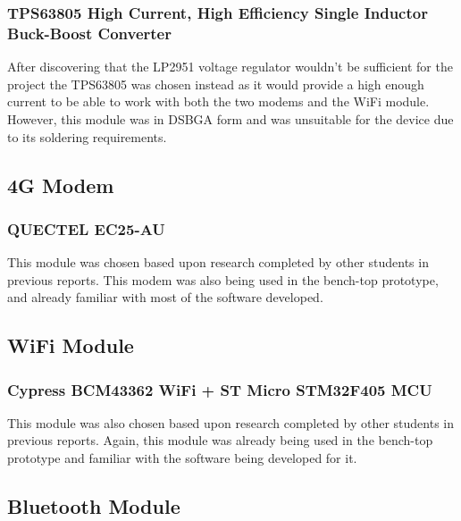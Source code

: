 \subsubsection{TPS63805 High Current, High Efficiency Single Inductor Buck-Boost Converter}

After discovering that the LP2951 voltage regulator wouldn't be sufficient for the project the TPS63805 was chosen instead as it would provide a high enough current to be able to work with both the two modems and the WiFi module. 
However, this module was in DSBGA form and was unsuitable for the device due to its soldering requirements. 



\subsection{4G Modem}
\subsubsection{ QUECTEL EC25-AU}

	This module was chosen based upon research completed by other students in previous reports. 
This modem was also being used in the bench-top prototype, and already familiar with most of the software developed. 

\subsection{WiFi Module}
\subsubsection{Cypress BCM43362 WiFi + ST Micro STM32F405 MCU}
		This module was also chosen based upon research completed by other students in previous reports. 
Again, this module was already being used in the bench-top prototype and familiar with the software being developed for it. 


\subsection{Bluetooth Module}

